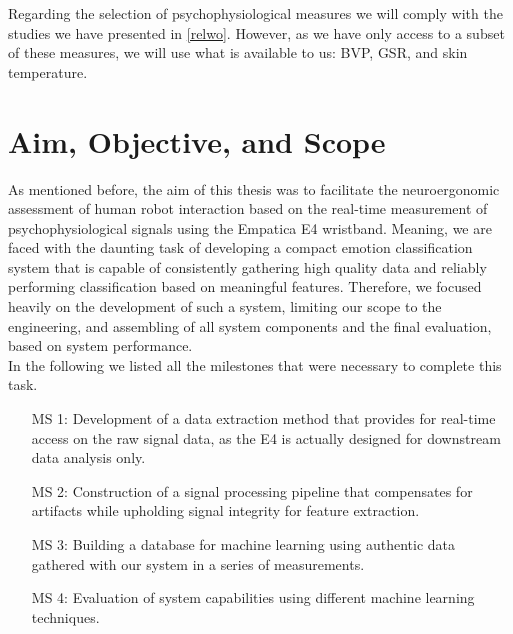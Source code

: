 Regarding the selection of psychophysiological measures we will comply with the studies we have presented in \ref{relwo}. However, as we have only access to a subset of these measures, we will use what is available to us: BVP, GSR, and skin temperature.

\section{Aim, Objective, and Scope}
As mentioned before, the aim of this thesis was to facilitate the neuroergonomic assessment of human robot interaction based on the real-time measurement of psychophysiological signals using the Empatica E4 wristband. 
Meaning, we are faced with the daunting task of developing a compact emotion classification system that is capable of consistently gathering high quality data and reliably performing classification based on meaningful features.
Therefore, we focused heavily on the development of such a system, limiting our scope to the engineering, and assembling of all system components and the final evaluation, based on system performance.\\
In the following we listed all the milestones that were necessary to complete this task.

\begin{center}
\begin{enumerate}
\item[MS 1:] Development of a data extraction method that provides for real-time access on the raw signal data, as the E4 is actually designed for downstream data analysis only.
\item[MS 2:] Construction of a signal processing pipeline that compensates for artifacts while upholding signal integrity for feature extraction.
\item[MS 3:] Building a database for machine learning using authentic data gathered with our system in a series of measurements. 
\item[MS 4:] Evaluation of system capabilities using different machine learning techniques.
\end{enumerate}
\end{center}

